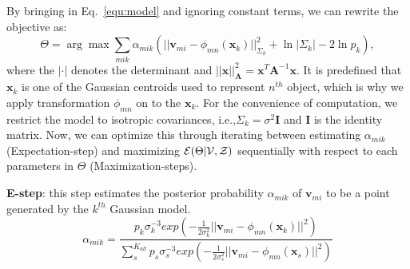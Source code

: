 By bringing in Eq.~\ref{equ:model} and ignoring constant terms, we can rewrite the objective as:
\begin{equation}
\label{equ:obj3}
\Theta=\arg\max\sum_{mik}\alpha_{mik}(||\mathbf{v}_{mi}-\phi_{mn}(\mathbf{x}_k)||_{\Sigma_k}^2 + \ln |\Sigma_k| - 2\ln p_k), 
\end{equation}
%
where the $|\cdot|$ denotes the determinant and $||\mathbf{x}||_{\mathbf{A}}^2= \mathbf{x}^T\mathbf{A}^{-1}\mathbf{x}$. 
%
It is predefined that $\mathbf{x}_k$ is one of the Gaussian centroids used to represent $n^{th}$ object, which is why we apply transformation $\phi_{mn}$ on to the $\mathbf{x}_k$. 
%
For the convenience of computation, we restrict the model to isotropic covariances, i.e.,$\Sigma_k=\sigma^2\mathbf{I}$ and $\mathbf{I}$ is the identity matrix.
%
Now, we can optimize this through iterating between estimating $\alpha_{mik}$ (Expectation-step) and maximizing $\mathcal{E}(\Theta|\mathcal{V},\mathcal{Z})$ sequentially with respect to each parameters in $\Theta$ (Maximization-steps).

\noindent\textbf{E-step}:
this step estimates the posterior probability $\alpha_{mik}$ of $\mathbf v_{mi}$ to be a point generated by the $k^{th}$ Gaussian model.
%
\begin{equation}
\label{equ:estep}
\alpha_{mik}=\frac{p_k\sigma_k^{-3}exp(-\frac{1}{2\sigma_k^2}||\mathbf v_{mi}-\phi_{mn}(\mathbf x_k)||^2)}{\sum_s^{K_{all}}p_s\sigma_s^{-3}exp(-\frac{1}{2\sigma_s^2}||\mathbf v_{mi}-\phi_{mn}(\mathbf x_s)||^2)}
\end{equation}
%


